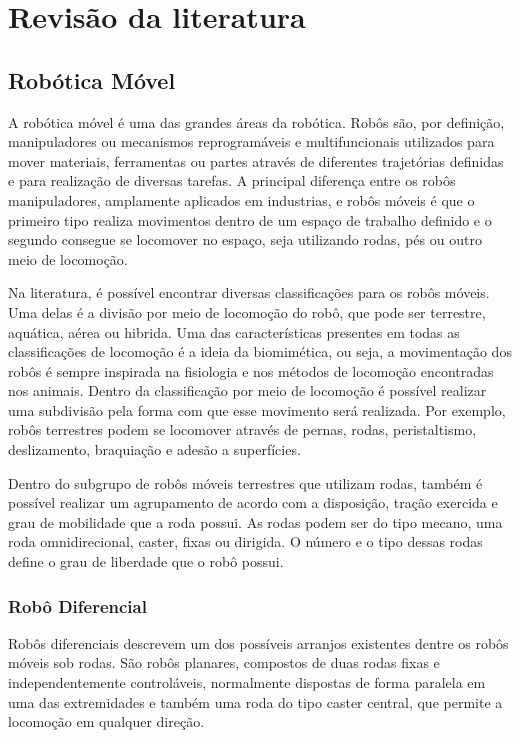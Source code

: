\chapter{Revisão da literatura}

\section{Robótica Móvel}
A robótica móvel é uma das grandes áreas da robótica. Robôs são, por definição, manipuladores ou mecanismos reprogramáveis e multifuncionais utilizados para mover materiais, ferramentas ou partes através de diferentes trajetórias definidas e para realização de diversas tarefas. A principal diferença entre os robôs manipuladores, amplamente aplicados em industrias, e robôs móveis é que o primeiro tipo realiza movimentos dentro de um espaço de trabalho definido e o segundo consegue se locomover no espaço, seja utilizando rodas, pés ou outro meio de locomoção. \cite{nehmzow2012mobile}
\par
Na literatura, é possível encontrar diversas classificações para os robôs móveis. Uma delas é a divisão por meio de locomoção do robô, que pode ser terrestre, aquática, aérea ou hibrida. Uma das características presentes em todas as classificações de locomoção é a ideia da biomimética, ou seja, a movimentação dos robôs é sempre inspirada na fisiologia e nos métodos de locomoção encontradas nos animais. \cite{russo2020survey} Dentro da classificação por meio de locomoção é possível realizar uma subdivisão pela forma com que esse movimento será realizada. Por exemplo, robôs terrestres podem se locomover através de pernas, rodas, peristaltismo, deslizamento, braquiação e adesão a superfícies. \cite{russo2020survey}
\par
Dentro do subgrupo de robôs móveis terrestres que utilizam rodas, também é possível realizar um agrupamento de acordo com a disposição, tração exercida e grau de mobilidade que a roda possui. As rodas podem ser do tipo mecano, uma roda omnidirecional, caster, fixas ou dirigida. O número e o tipo dessas rodas define o grau de liberdade que o robô possui. \cite{gruber2016} 
\subsection{Robô Diferencial}
Robôs diferenciais descrevem um dos possíveis arranjos existentes dentre os robôs móveis sob rodas. São robôs planares, compostos de duas rodas fixas e independentemente controláveis, normalmente dispostas de forma paralela em uma das extremidades e também uma roda do tipo caster central, que permite a locomoção em qualquer direção.
